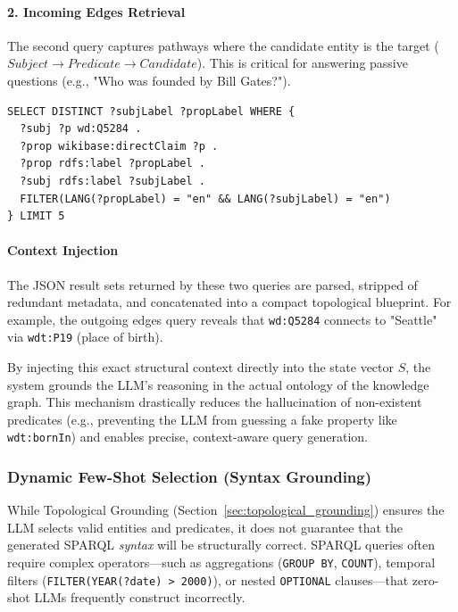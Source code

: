 \paragraph{2. Incoming Edges Retrieval}
The second query captures pathways where the candidate entity is the target ($Subject \rightarrow Predicate \rightarrow Candidate$). This is critical for answering passive questions (e.g., "Who was founded by Bill Gates?").

\begin{lstlisting}[basicstyle=\ttfamily\footnotesize, frame=single, caption={SPARQL query to fetch incoming 1st-hop edges, where wd:Q5284 acts as the object.}, label={lst:incoming_edges}]
SELECT DISTINCT ?subjLabel ?propLabel WHERE {
  ?subj ?p wd:Q5284 .
  ?prop wikibase:directClaim ?p .
  ?prop rdfs:label ?propLabel .
  ?subj rdfs:label ?subjLabel .
  FILTER(LANG(?propLabel) = "en" && LANG(?subjLabel) = "en")
} LIMIT 5
\end{lstlisting}

\paragraph{Context Injection}
The JSON result sets returned by these two queries are parsed, stripped of redundant metadata, and concatenated into a compact topological blueprint. For example, the outgoing edges query reveals that \texttt{wd:Q5284} connects to "Seattle" via \texttt{wdt:P19} (place of birth). 

By injecting this exact structural context directly into the state vector $S$, the system grounds the LLM's reasoning in the actual ontology of the knowledge graph. This mechanism drastically reduces the hallucination of non-existent predicates (e.g., preventing the LLM from guessing a fake property like \texttt{wdt:bornIn}) and enables precise, context-aware query generation.

\subsubsection{Dynamic Few-Shot Selection (Syntax Grounding)}
\label{sec:dynamic_few_shot}

While Topological Grounding (Section~\ref{sec:topological_grounding}) ensures the LLM selects valid entities and predicates, it does not guarantee that the generated SPARQL \textit{syntax} will be structurally correct. SPARQL queries often require complex operators—such as aggregations (\texttt{GROUP BY}, \texttt{COUNT}), temporal filters (\texttt{FILTER(YEAR(?date) > 2000)}), or nested \texttt{OPTIONAL} clauses—that zero-shot LLMs frequently construct incorrectly. 

